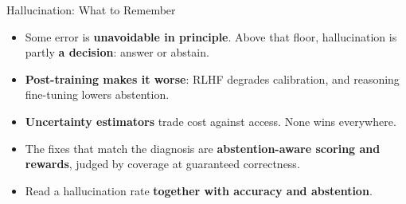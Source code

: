 \begin{frame}{Hallucination: What to Remember}
    \begin{itemize}\itemsep0.55em
        \item Some error is \textbf{unavoidable in principle}. Above that floor, hallucination is partly \textbf{a decision}: answer or abstain.
        \item \textbf{Post-training makes it worse}: RLHF degrades calibration, and reasoning fine-tuning lowers abstention.
        \item \textbf{Uncertainty estimators} trade cost against access. None wins everywhere.
        \item The fixes that match the diagnosis are \textbf{abstention-aware scoring and rewards}, judged by coverage at guaranteed correctness.
        \item Read a hallucination rate \textbf{together with accuracy and abstention}.
    \end{itemize}
    \vspace{0.4em}
\end{frame}
